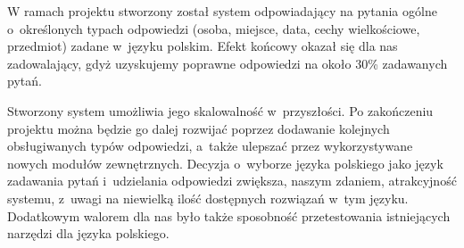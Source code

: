 W ramach projektu stworzony został system odpowiadający na pytania ogólne o~określonych typach odpowiedzi (osoba, miejsce, data, cechy wielkościowe, przedmiot) zadane w~języku polskim. Efekt końcowy okazał się dla nas zadowalający, gdyż uzyskujemy poprawne odpowiedzi na około 30\% zadawanych pytań.

Stworzony system umożliwia jego skalowalność w~przyszłości. Po zakończeniu projektu można będzie go dalej rozwijać poprzez dodawanie kolejnych obsługiwanych typów odpowiedzi, a~także ulepszać przez wykorzystywane nowych modułów zewnętrznych.  Decyzja o~wyborze języka polskiego jako język zadawania pytań i~udzielania odpowiedzi zwiększa, naszym zdaniem, atrakcyjność systemu, z~uwagi na niewielką ilość dostępnych rozwiązań w~tym języku. Dodatkowym walorem dla nas było także sposobność przetestowania istniejących narzędzi dla języka polskiego.



